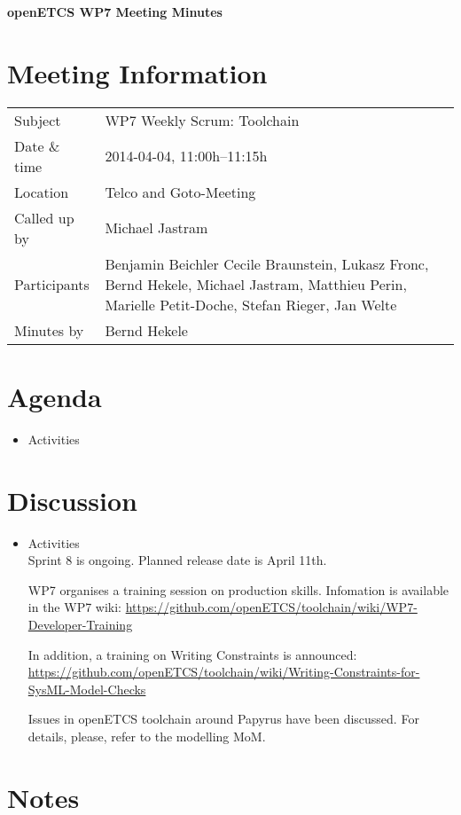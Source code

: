 \documentclass[a4paper, 11pt]{article}
\begin{document}
{\begin{center}\huge\bf openETCS WP7 Meeting Minutes\end{center}}
\section{Meeting Information}

\renewcommand{\arraystretch}{1.5}
\begin{supertabular}{m{.2\textwidth}m{.8\textwidth}}
Subject & WP7 Weekly Scrum: Toolchain\\
Date \& time & 2014-04-04, 11:00h--11:15h\\
Location & Telco and Goto-Meeting\\
Called up by & Michael Jastram\\
Participants &
Benjamin Beichler
Cecile Braunstein,
Lukasz Fronc,
Bernd Hekele,
Michael Jastram,
Matthieu Perin,
Marielle Petit-Doche,
Stefan Rieger,
Jan Welte
\\

Minutes by & Bernd Hekele\\

\end{supertabular}
\renewcommand{\arraystretch}{1.0}


\section{Agenda}
\begin{itemize}
\item Activities
\end{itemize}

\section{Discussion}

\begin{itemize}
\item Activities\\
Sprint 8 is ongoing. Planned release date is April 11th.

WP7 organises a training session on production skills. Infomation is available in the WP7 wiki: \url{https://github.com/openETCS/toolchain/wiki/WP7-Developer-Training}

In addition, a training on Writing Constraints is announced:
\url{https://github.com/openETCS/toolchain/wiki/Writing-Constraints-for-SysML-Model-Checks} 

Issues in openETCS toolchain around Papyrus have been discussed. For details, please, refer to the modelling MoM.

\end{itemize}

\section{Notes}
\end{document}
